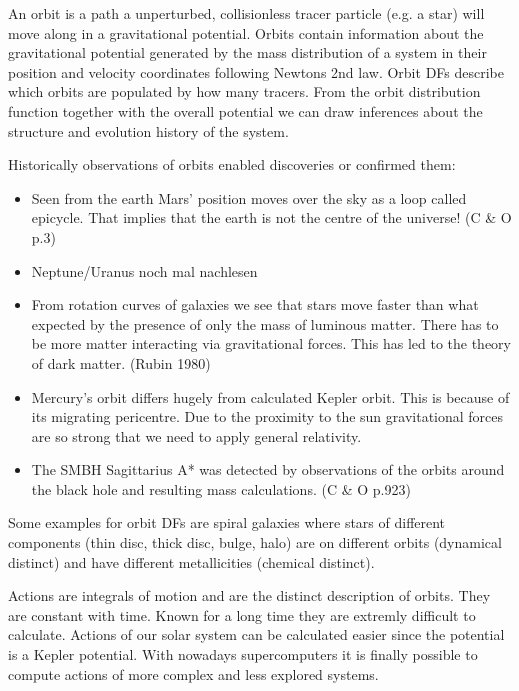 \par An orbit is a path a unperturbed, collisionless tracer particle (e.g. a star) will move along in a gravitational potential. Orbits contain information about the gravitational potential generated by the mass distribution of a system in their position and velocity coordinates following Newtons 2nd law. Orbit \acp{DF} describe which orbits are populated by how many tracers. From the orbit distribution function together with the overall potential we can draw inferences about the structure and evolution history of the system. 
\par Historically observations of orbits enabled discoveries or confirmed them: 
\begin{itemize}
\item Seen from the earth Mars' position moves over the sky as a loop called epicycle. That implies that the earth is not the centre of the universe! (C \& O p.3)
\item Neptune/Uranus \color{red} noch mal nachlesen \color{black}
\item From rotation curves of galaxies we see that stars move faster than what expected by the presence of only the mass of luminous matter. There has to be more matter interacting via gravitational forces. This has led to the theory of dark matter. (Rubin 1980)
\item Mercury's orbit differs hugely from calculated Kepler orbit. This is because of its migrating pericentre. Due to the proximity to the sun gravitational forces are so strong that we need to apply general relativity.
\item The \ac{SMBH} Sagittarius A*  was detected by observations of the orbits around the black hole and resulting mass calculations. (C \& O p.923)
\end{itemize}
\par Some examples for orbit \acp{DF} are spiral galaxies where stars of different components (thin disc, thick disc, bulge, halo) are on different orbits (dynamical distinct) and have different metallicities (chemical distinct).
\\\par Actions are integrals of motion and are the distinct description of orbits. They are constant with time. Known for a long time they are extremly difficult to calculate. Actions of our solar system can be calculated easier since the potential is a Kepler potential. With nowadays supercomputers it is finally possible to compute actions of more complex and less explored systems.
